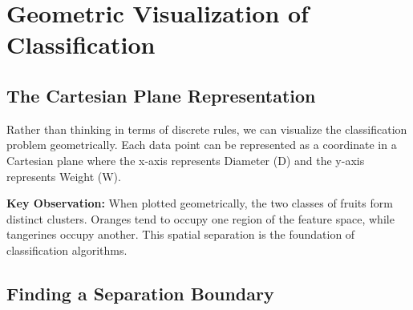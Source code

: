 \documentclass[12pt,a4paper]{article}
\theoremstyle{directpoint}
\theoremstyle{definition}
\begin{document}
\newpage

\section{Geometric Visualization of Classification}

\subsection{The Cartesian Plane Representation}

Rather than thinking in terms of discrete rules, we can visualize the classification problem geometrically. Each data point can be represented as a coordinate in a Cartesian plane where the x-axis represents Diameter (D) and the y-axis represents Weight (W).

\begin{center}
\end{center}

\textbf{Key Observation:} When plotted geometrically, the two classes of fruits form distinct clusters. Oranges tend to occupy one region of the feature space, while tangerines occupy another. This spatial separation is the foundation of classification algorithms.

\subsection{Finding a Separation Boundary}
\end{document}
